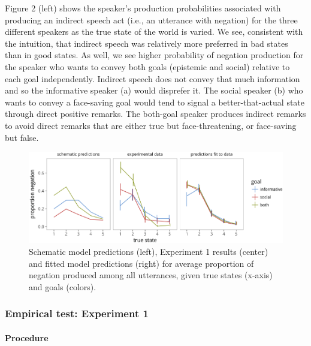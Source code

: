 Figure 2 (left) shows the speaker's production probabilities associated %
with producing an indirect speech act (i.e., an utterance with negation)
for the three different speakers as the true state of the world is
varied. We see, consistent with the intuition, that indirect speech was
relatively more preferred in bad states than in good states. As well, we
see higher probability of negation production for the speaker who wants
to convey both goals (epistemic and social) relative to each goal
independently. Indirect speech does not convey that much information and
so the informative speaker (a) would disprefer it. The social speaker
(b) who wants to convey a face-saving goal would tend to signal a
better-that-actual state through direct positive remarks. The both-goal
speaker produces indirect remarks to avoid direct remarks that are
either true but face-threatening, or face-saving but false.

\begin{CodeChunk}
\begin{figure}[t]

{\centering \includegraphics{figures/exptModelNeg-1} 

}

\caption{Schematic model predictions (left), Experiment 1 results (center) and fitted model predictions (right) for average proportion of negation produced among all utterances, given true states (x-axis) and goals (colors).}\label{fig:model_pred_negNoneg}
\end{figure}
\end{CodeChunk}

\subsubsection{Empirical test: Experiment 1} 

\paragraph{Procedure}

